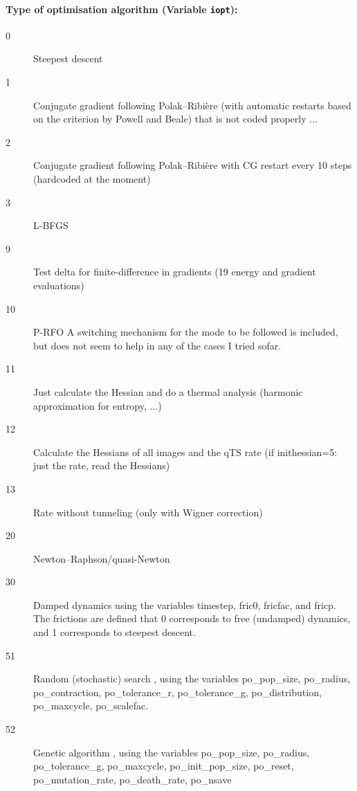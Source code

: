 \documentclass{article}
\begin{document}
\paragraph{Type of optimisation algorithm (Variable \texttt{iopt}):}
\begin{description}
\item[0] Steepest descent
\item[1] Conjugate gradient following Polak--Ribi\`ere \cite{pol69} (with automatic
  restarts based on the criterion by Powell and Beale) that is not coded
  properly ...
\item[2] Conjugate gradient following Polak--Ribi\`ere \cite{pol69} with CG
  restart every 10 steps (hardcoded at the moment)
\item[3] L-BFGS \cite{liu89,noc80}
\item[9] Test delta for finite-difference in gradients (19 energy and gradient evaluations)
\item[10] P-RFO \cite{cer81,sim83,ban85,bak86} A switching mechanism for the
  mode to be followed is included, but does not seem to help in any of the
  cases I tried sofar.
\item[11] Just calculate the Hessian and do a thermal analysis (harmonic
  approximation for entropy, ...)
\item[12] Calculate the Hessians of all images and the qTS rate (if inithessian=5: just the rate, read the Hessians)
\item[13] Rate without tunneling (only with Wigner correction)
\item[20] Newton--Raphson/quasi-Newton
\item[30] Damped dynamics using the variables timestep, fric0, fricfac, and
  fricp. The frictions are defined that 0 corresponds to free (undamped)
  dynamics, and 1 corresponds to steepest descent.
\item[51] Random (stochastic) search \cite{brooks57,luusj73}, using the variables po\_pop\_size, po\_radius,
            po\_contraction, po\_tolerance\_r, po\_tolerance\_g, 
            po\_distribution, po\_maxcycle, po\_scalefac.
\item[52] Genetic algorithm \cite{holland75,goldberg89,haupth98}, using the variables po\_pop\_size, po\_radius,
            po\_tolerance\_g, po\_maxcycle, po\_init\_pop\_size, po\_reset, 
            po\_mutation\_rate, po\_death\_rate, po\_nsave
\end{description}
\end{document}
